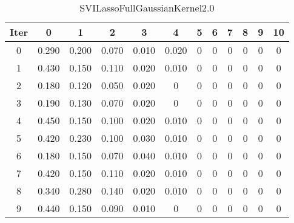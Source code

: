 \begin{table}
	\begin{center}
		\begin{tabular}{|c|c|c|c|c|c|c|c|c|c|c|c|}
			\hline
			Iter & 0 & 1 & 2 & 3 & 4 & 5 & 6 & 7 & 8 & 9 & 10 \\
			\hline
			0 & 0.290 & 0.200 & 0.070 & 0.010 & 0.020 & 0 & 0 & 0 & 0 & 0 & 0 \\
			\hline
			1 & 0.430 & 0.150 & 0.110 & 0.020 & 0.010 & 0 & 0 & 0 & 0 & 0 & 0 \\
			\hline
			2 & 0.180 & 0.120 & 0.050 & 0.020 & 0 & 0 & 0 & 0 & 0 & 0 & 0 \\
			\hline
			3 & 0.190 & 0.130 & 0.070 & 0.020 & 0 & 0 & 0 & 0 & 0 & 0 & 0 \\
			\hline
			4 & 0.450 & 0.150 & 0.100 & 0.020 & 0.010 & 0 & 0 & 0 & 0 & 0 & 0 \\
			\hline
			5 & 0.420 & 0.230 & 0.100 & 0.030 & 0.010 & 0 & 0 & 0 & 0 & 0 & 0 \\
			\hline
			6 & 0.180 & 0.150 & 0.070 & 0.040 & 0.010 & 0 & 0 & 0 & 0 & 0 & 0 \\
			\hline
			7 & 0.420 & 0.150 & 0.110 & 0.020 & 0.010 & 0 & 0 & 0 & 0 & 0 & 0 \\
			\hline
			8 & 0.340 & 0.280 & 0.140 & 0.020 & 0.010 & 0 & 0 & 0 & 0 & 0 & 0 \\
			\hline
			9 & 0.440 & 0.150 & 0.090 & 0.010 & 0 & 0 & 0 & 0 & 0 & 0 & 0 \\
			\hline
		\end{tabular}
	\end{center}
	\caption{SVILassoFullGaussianKernel2.0}
\end{table}